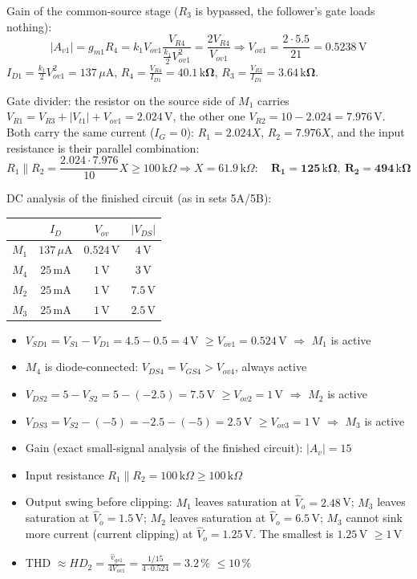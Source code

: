 \documentclass[11pt]{article}
\newcommand{\solstep}[2]{\par\medskip{\color{stepc}\textbf{Step #1 --- #2}}\par\nopagebreak}
\begin{document}
Gain of the common-source stage ($R_3$ is bypassed, the follower's gate loads nothing): \[|A_{v1}| = g_{m1}R_4 = k_1V_{ov1}\frac{V_{R4}}{\frac{k_1}{2}V_{ov1}^2} = \frac{2V_{R4}}{V_{ov1}} \Rightarrow V_{ov1} = \frac{2\cdot5.5}{21} = 0.5238\,\mathrm{V}\]$I_{D1} = \frac{k_1}{2}V_{ov1}^2 = 137\,\mu \mathrm{A}$, $R_4 = \frac{V_{R4}}{I_{D1}} = \mathbf{40.1\,\mathrm{k}\Omega}$, $R_3 = \frac{V_{R3}}{I_{D1}} = \mathbf{3.64\,\mathrm{k}\Omega}$.

Gate divider: the resistor on the source side of $M_1$ carries $V_{R1} = V_{R3} + |V_{t1}| + V_{ov1} = 2.024$\,V, the other one $V_{R2} = 10 - 2.024 = 7.976$\,V. Both carry the same current ($I_G = 0$): $R_{1} = 2.024X$, $R_{2} = 7.976X$, and the input resistance is their parallel combination: \[R_1\|R_2 = \frac{2.024\cdot7.976}{10}X \ge 100\,\mathrm{k}\Omega \Rightarrow X = 61.9\,\mathrm{k}\Omega:\quad \mathbf{R_1 = 125\,\mathrm{k}\Omega},\ \mathbf{R_2 = 494\,\mathrm{k}\Omega}\]
\solstep{4}{Check by analysis}DC analysis of the finished circuit (as in sets 5A/5B):\begin{center}\renewcommand{\arraystretch}{1.35}
\begin{tabular}{cccc}
\toprule
 & $I_D$ & $V_{ov}$ & $|V_{DS}|$ \\
\midrule
$M_{1}$ & $137\,\mu \mathrm{A}$ & $0.524$\,V & $4$\,V \\
$M_{4}$ & $25\,\mathrm{m}\mathrm{A}$ & $1$\,V & $3$\,V \\
$M_{2}$ & $25\,\mathrm{m}\mathrm{A}$ & $1$\,V & $7.5$\,V \\
$M_{3}$ & $25\,\mathrm{m}\mathrm{A}$ & $1$\,V & $2.5$\,V \\
\bottomrule
\end{tabular}\end{center}
\begin{itemize}[leftmargin=*,itemsep=2pt]
\item $V_{SD1} = V_{S1} - V_{D1} = 4.5 - 0.5 = 4\,\mathrm{V}$ $\ge V_{ov1} = 0.524$\,V $\Rightarrow$ $M_{1}$ is active \checkmark
\item $M_{4}$ is diode-connected: $V_{DS4} = V_{GS4} > V_{ov4}$, always active \checkmark
\item $V_{DS2} = 5 - V_{S2} = 5 - (-2.5) = 7.5\,\mathrm{V}$ $\ge V_{ov2} = 1$\,V $\Rightarrow$ $M_{2}$ is active \checkmark
\item $V_{DS3} = V_{S2} - (-5) = -2.5 - (-5) = 2.5\,\mathrm{V}$ $\ge V_{ov3} = 1$\,V $\Rightarrow$ $M_{3}$ is active \checkmark
\item Gain (exact small-signal analysis of the finished circuit): $|A_v| = 15$ \checkmark
\item Input resistance $R_1\|R_2 = 100\,\mathrm{k}\Omega \ge 100\,\mathrm{k}\Omega$ \checkmark
\item Output swing before clipping: $M_1$ leaves saturation at $\hat V_o = 2.48$\,V; $M_3$ leaves saturation at $\hat V_o = 1.5$\,V; $M_2$ leaves saturation at $\hat V_o = 6.5$\,V; $M_3$ cannot sink more current (current clipping) at $\hat V_o = 1.25$\,V. The smallest is $1.25$\,V $\ge 1$\,V \checkmark
\item THD $\approx HD_2 = \frac{\hat v_{gs1}}{4V_{ov1}} = \frac{1/15}{4\cdot0.524} = 3.2\,\%$ $\le 10\,\%$ \checkmark
\end{itemize}
\end{document}
